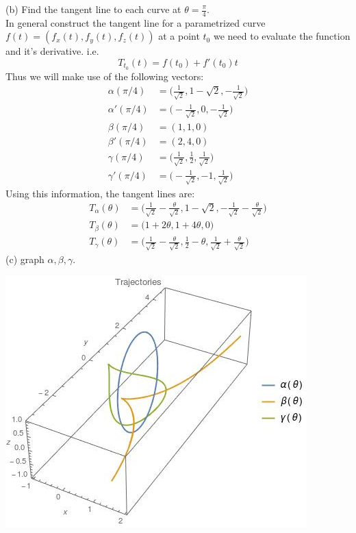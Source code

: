 \documentclass[a4paper, 11pt]{article}
\begin{document}
\noindent(b) Find the tangent line to each curve at $\theta = \frac{\pi}{4} $. \\ 

\noindent In general construct the tangent line for a parametrized curve $f(t) = (f_x(t), f_y(t), f_z(t))$ at a point $t_0$ we need to evaluate the function and it's derivative. i.e. 
	$$ T_{t_0} (t) = f(t_0) + f'(t_0)t $$ 
Thus we will make use of the following vectors: 
	\begin{align*}
		\alpha(\pi/4) &= \Big(\frac{1}{\sqrt{2}}, 1-\sqrt{2}, -\frac{1}{\sqrt{2}}\Big) \\ 
		\alpha'(\pi/4) &= \Big( -\frac{1}{\sqrt{2}},0, -\frac{1}{\sqrt{2}} \Big) \\
		\beta(\pi/4) &= (1,1,0) \\ 
		\beta'(\pi/4) &= (2,4,0) \\ 
		\gamma(\pi/4) &= \Big(\frac{1}{\sqrt{2}}, \frac{1}{2}, \frac{1}{\sqrt{2}}\Big) \\ 
		\gamma'(\pi/4) &= \Big(-\frac{1}{\sqrt{2}}, -1, \frac{1}{\sqrt{2}}\Big)
	\end{align*}
Using this information, the tangent lines are: 
	\begin{align*}
		T_{\alpha}(\theta) &= \Big( \frac{1}{\sqrt{2}}-\frac{\theta}{\sqrt{2}}, 1-\sqrt{2}, -\frac{1}{\sqrt{2}}-\frac{\theta}{\sqrt{2}}\Big)  \\ 
		T_{\beta}(\theta) &= \Big( 1+2\theta, 1+4\theta, 0\Big) \\ 
		T_{\gamma}(\theta) &= \Big(  \frac{1}{\sqrt{2}}-\frac{\theta}{\sqrt{2}}, \frac{1}{2} - \theta, \frac{1}{\sqrt{2}}+\frac{\theta}{\sqrt{2}}\Big) 
	\end{align*}
\noindent (c) graph $\alpha, \beta, \gamma$. 
	\begin{center}
		\includegraphics[scale=0.75]{1c}
	\end{center}
\end{document}
